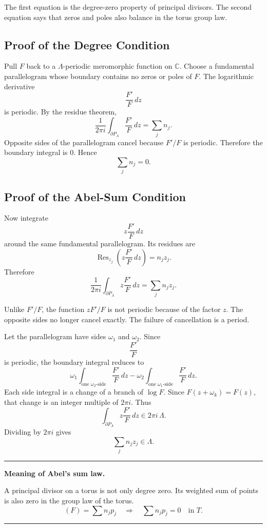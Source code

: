 \documentclass[11pt]{article}
\newcommand{\C}{\mathbb{C}}
\newcommand{\Res}{\operatorname{Res}}
\newenvironment{keyidea}[1]{%
  \par\medskip
  \begin{center}
  \begin{minipage}{0.92\textwidth}
  \hrule
  \smallskip
  \textbf{#1.}\quad\ignorespaces
}{%
  \smallskip
  \hrule
  \end{minipage}
  \end{center}
  \medskip
}
\begin{document}
The first equation is the degree-zero property of principal divisors.  The
second equation says that zeros and poles also balance in the torus group
law.

\subsection{Proof of the Degree Condition}

Pull \(F\) back to a \(\Lambda\)-periodic meromorphic function on \(\C\).
Choose a fundamental parallelogram whose boundary contains no zeros or poles
of \(F\).  The logarithmic derivative
\[
\frac{F'}{F}\,dz
\]
is periodic.  By the residue theorem,
\[
\frac{1}{2\pi i}
\int_{\partial P_\Lambda}\frac{F'}{F}\,dz
=
\sum_j n_j.
\]
Opposite sides of the parallelogram cancel because \(F'/F\) is periodic.
Therefore the boundary integral is \(0\).  Hence
\[
\sum_j n_j=0.
\]

\subsection{Proof of the Abel-Sum Condition}

Now integrate
\[
z\frac{F'}{F}\,dz
\]
around the same fundamental parallelogram.  Its residues are
\[
\Res_{z_j}
\left(
z\frac{F'}{F}\,dz
\right)
=
n_jz_j.
\]
Therefore
\[
\frac{1}{2\pi i}
\int_{\partial P_\Lambda}
z\frac{F'}{F}\,dz
=
\sum_j n_jz_j.
\]

Unlike \(F'/F\), the function \(zF'/F\) is not periodic because of the
factor \(z\).  The opposite sides no longer cancel exactly.  The failure of
cancellation is a period.

Let the parallelogram have sides \(\omega_1\) and \(\omega_2\).  Since
\[
\frac{F'}{F}
\]
is periodic, the boundary integral reduces to
\[
\omega_1\int_{\text{one }\omega_2\text{-side}}\frac{F'}{F}\,dz
-
\omega_2\int_{\text{one }\omega_1\text{-side}}\frac{F'}{F}\,dz.
\]
Each side integral is a change of a branch of \(\log F\).  Since
\(F(z+\omega_k)=F(z)\), that change is an integer multiple of \(2\pi i\).
Thus
\[
\int_{\partial P_\Lambda}z\frac{F'}{F}\,dz
\in
2\pi i\,\Lambda.
\]
Dividing by \(2\pi i\) gives
\[
\sum_j n_jz_j\in\Lambda.
\]

\begin{keyidea}{Meaning of Abel's sum law}
A principal divisor on a torus is not only degree zero.  Its weighted sum of
points is also zero in the group law of the torus.
\[
(F)=\sum n_jp_j
\quad\Longrightarrow\quad
\sum n_jp_j=0\quad\text{in }T.
\]
\end{keyidea}
\end{document}
